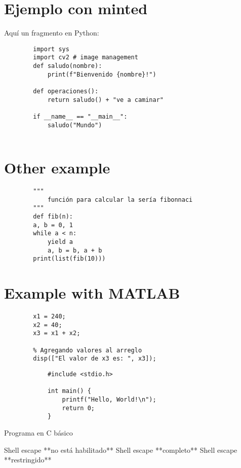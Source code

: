 \documentclass[11pt]{article}
\begin{document}
	
	\section*{Ejemplo con minted}
	
	Aquí un fragmento en Python:
	
	\begin{verbatim}
		import sys
		import cv2 # image management
		def saludo(nombre):
			print(f"Bienvenido {nombre}!")
		
		def operaciones():
			return saludo() + "ve a caminar"
			
		if __name__ == "__main__":
			saludo("Mundo")
		
	\end{verbatim}
	
	\section*{Other example}
	\begin{verbatim}
		"""
			función para calcular la sería fibonnaci
		"""
		def fib(n):
		a, b = 0, 1
		while a < n:
			yield a
			a, b = b, a + b
		print(list(fib(10)))
	\end{verbatim}
	
	\section*{Example with MATLAB}
	\begin{verbatim}
		x1 = 240;
		x2 = 40;
		x3 = x1 + x2;
		
		% Agregando valores al arreglo
		disp(["El valor de x3 es: ", x3]);
	\end{verbatim}
	
	\begin{listing}[H]
		\begin{verbatim}
			#include <stdio.h>
			
			int main() {
				printf("Hello, World!\n");
				return 0;
			}
		\end{verbatim}
		\caption{Programa en C básico}
		\label{lst:c-program}
	\end{listing}
	
	\ifcase\ShellEscapeStatus
	Shell escape **no está habilitado**\or
	Shell escape **completo**\or
	Shell escape **restringido**
	\fi
\end{document}
